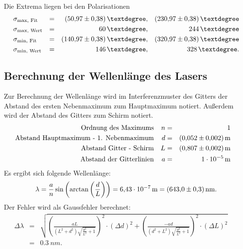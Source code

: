 %
Die Extrema liegen bei den Polarisationen
\begin{align*}
  &\sigma_{\text{max, Fit}} &=&& \SI{50.97 \pm 0.38}{°},   && \SI{230.97 \pm 0.38}{°} \\
  &\sigma_{\text{max, Wert}} &=&& \SI{ 60 }{°},                          && \SI{ 244 }{°} \\
  &\sigma_{\text{min, Fit}} &=&& \SI{140.97 \pm 0.38}{°},  && \SI{320.97 \pm 0.38}{°} \\
  &\sigma_{\text{min, Wert}} &=&& \SI{ 146 }{°},                         && \SI{ 328 }{°}. \\
\end{align*}
\FloatBarrier

\subsection{Berechnung der Wellenlänge des Lasers}
Zur Berechnung der Wellenlänge wird im Interferenzmuster des Gitters der Abstand des ersten Nebenmaximum zum Hauptmaximum notiert.
Außerdem wird der Abstand des Gitters zum Schirm notiert.
\begin{align*}
\text{Ordnung des Maximums}                        && n &=&\SI{1}{}&&\\
\text{Abstand Hauptmaximum - 1. Nebenmaximum}      && d &=&\SI{0.052 \pm 0.002}{m} && \\
\text{Abstand Gitter - Schirm}                     && L &=&\SI{0.807 \pm 0.002}{m} && \\
\text{Abstand der Gitterlinien}                    && a &=&\SI{1e-05}{m} && \\
\end{align*}
Es ergibt sich folgende Wellenlänge:
\begin{equation*}
    \lambda = \frac{a}{n} \sin{\left( \arctan{\left( \frac{d}{L} \right)} \right)} = \SI{6.43e-07}{m} = \SI{643.0 \pm 0.3}{nm}.
\end{equation*}
Der Fehler wird als Gaussfehler berechnet:
\begin{align*}
  \Delta \lambda &=& \sqrt{ \left( \frac{aL}{ \left( L^2 + d^2 \right) \sqrt{ \frac{d^2}{L^2} + 1 }} \right)^2 \cdot \left(\Delta d \right)^2 + \left( \frac{-ad}{ \left( d^2 + L^2 \right) \sqrt{ \frac{d^2}{L^2} + 1 }} \right)^2 \cdot \left( \Delta L \right)^2 } &&\\
                 &=& \SI{0.3}{nm}. &&
\end{align*}
